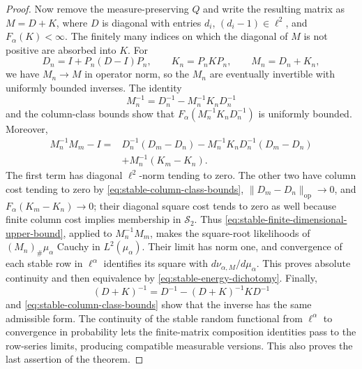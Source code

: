 \begin{proof}
Now remove the measure-preserving \(Q\) and write the resulting matrix as
\(M=D+K\), where \(D\) is diagonal with entries \(d_i\),
\((d_i-1)\in\ell^2\), and
\(F_\alpha(K)<\infty\).
The finitely many indices on which the diagonal of \(M\) is not positive
are absorbed into \(K\).
For
\[
 D_n=I+P_n(D-I)P_n,
 \qquad K_n=P_nKP_n,
 \qquad M_n=D_n+K_n,
\]
we have \(M_n\to M\) in operator norm, so the \(M_n\) are eventually
invertible with uniformly bounded inverses.
The identity
\[
 M_n^{-1}=D_n^{-1}-M_n^{-1}K_nD_n^{-1}
\]
and the column-class bounds show that
\(F_\alpha(M_n^{-1}K_nD_n^{-1})\) is uniformly bounded.  Moreover,
\begin{equation}
 \begin{aligned}
 M_n^{-1}M_m-I
 ={}&D_n^{-1}(D_m-D_n)-M_n^{-1}K_nD_n^{-1}(D_m-D_n)\\
    &+M_n^{-1}(K_m-K_n).
 \end{aligned}
 \label{eq:stable-relative-approximants}
\end{equation}
The first term has diagonal \(\ell^2\)-norm tending to zero.
The other two have column cost tending to zero by
\eqref{eq:stable-column-class-bounds},
\(\|D_m-D_n\|_{\mathrm{op}}\to0\), and
\(F_\alpha(K_m-K_n)\to0\); their diagonal square cost tends to zero as
well because finite column cost implies membership in \(\mathcal S_2\).
Thus \eqref{eq:stable-finite-dimensional-upper-bound}, applied to
\(M_n^{-1}M_m\), makes the square-root likelihoods of
\((M_n)_\#\mu_\alpha\) Cauchy in \(L^2(\mu_\alpha)\).
Their limit has norm one, and convergence of each stable row in
\(\ell^\alpha\) identifies its square with
\(d\nu_{\alpha,M}/d\mu_\alpha\).
This proves absolute continuity and then equivalence by
\eqref{eq:stable-energy-dichotomy}.
Finally,
\begin{equation}
 (D+K)^{-1}
 =D^{-1}-(D+K)^{-1}KD^{-1}
 \label{eq:stable-inverse-decomposition}
\end{equation}
and \eqref{eq:stable-column-class-bounds} show that the inverse has the same
admissible form.
The continuity of the stable random functional from \(\ell^\alpha\) to
convergence in probability lets the finite-matrix composition identities
pass to the row-series limits, producing compatible measurable versions.
This also proves the last assertion of the theorem.


\end{proof}
